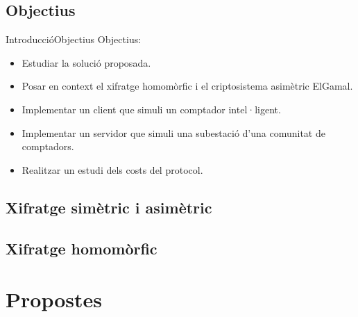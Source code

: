 \documentclass{beamer}
\begin{document}
\subsection{Objectius}
\begin{frame}{Introducció}{Objectius}
	Objectius:
	\begin{itemize}
		\item Estudiar la solució proposada.
		\item Posar en context el xifratge homomòrfic i el criptosistema asimètric ElGamal.
		\item Implementar un client que simuli un comptador intel·ligent.
		\item Implementar un servidor que simuli una subestació d'una comunitat de comptadors.
		\item Realitzar un estudi dels costs del protocol.
	\end{itemize}
\end{frame}

\subsection{Xifratge simètric i asimètric}

\subsection{Xifratge homomòrfic}

\section{Propostes}
\end{document}
